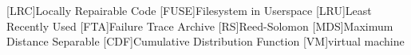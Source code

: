 \begin{acronym}
[LRC]{Locally Repairable Code}
[FUSE]{Filesystem in Userspace}
[LRU]{Least Recently Used}
[FTA]{Failure Trace Archive}
[RS]{Reed-Solomon}
[MDS]{Maximum Distance Separable}
[CDF]{Cumulative Distribution Function}
[VM]{virtual machine}
\end{acronym}
